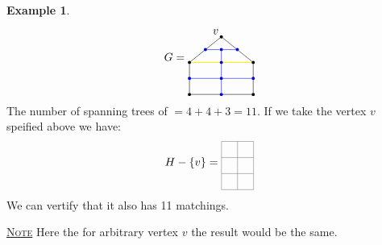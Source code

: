 \documentclass{report}
\newcommand{\fancyem}[1]{\underline{\textsc{#1}}}
\theoremstyle{definition}
\newtheorem{example}{Example}[section]
\theoremstyle{remark}
\numberwithin{equation}{section}
\begin{document}
\begin{example}
    \[
        G = \begin{tikzpicture}[baseline=(current bounding box.center)]
            \node[shape=circle, fill=black, scale = 0.3] (A1) at (1, 1.8) {};
            \node[above left] at (A1.south east) {$v$};
            \node[shape=circle, fill=black, scale = 0.3] (A2) at (0, 0) {};
            \node[shape=circle, fill=black, scale = 0.3] (A3) at (2, 0) {};
            \node[shape=circle, fill=black, scale = 0.3] (A4) at (2, 1) {};
            \node[shape=circle, fill=black, scale = 0.3] (A5) at (0, 1) {};

            \draw[] (A5) -- (A2) -- (A3) -- (A4) -- (A1) -- (A5);
            \draw[yellow, thick] (A4) -- (A5);

            \node[shape=circle, fill=blue, scale = 0.3] (A6) at (0.5, 1.4) {};
            \node[shape=circle, fill=blue, scale = 0.3] (A7) at (1.5, 1.4) {};
            \node[shape=circle, fill=blue, scale = 0.3] (A8) at (1, 1) {};
            \node[shape=circle, fill=blue, scale = 0.3] (A9) at (0, 0.5) {};
            \node[shape=circle, fill=blue, scale = 0.3] (A10) at (1, 0) {};
            \node[shape=circle, fill=blue, scale = 0.3] (A11) at (2, 0.5) {};
            \node[shape=circle, fill=blue, scale = 0.3] (A12) at (1, 1.4) {};
            \node[shape=circle, fill=blue, scale = 0.3] (A13) at (1, 0.5) {};

            \draw[blue] (A6) -- (A12) -- (A7);
            \draw[blue] (A12) -- (A8) -- (A13) -- (A10);
            \draw[blue] (A9) -- (A13) -- (A11);
            
        \end{tikzpicture}
    \]
    The number of spanning trees of $= 4 + 4 + 3 = 11$. If we take the vertex $v$ speified above we have:
    \[
        H - \{v\} = \begin{tikzpicture}[baseline=(current bounding box.center)]
            \draw[step = 0.5cm, gray, thin] (0, 0) grid (1, 1.5);
        \end{tikzpicture} 
    \]
    We can vertify that it also has 11 matchings.

    \fancyem{Note} Here the for arbitrary vertex $v$ the result would be the same.
\end{example}
\end{document}
